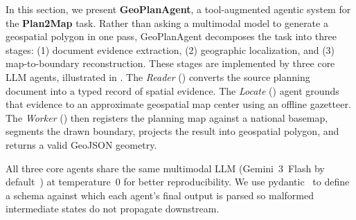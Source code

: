 \documentclass[11pt]{article}
\begin{document}
In this section, we present \textbf{GeoPlanAgent}, a tool-augmented agentic system for the \textbf{Plan2Map} task. Rather than asking a multimodal model to generate a geospatial polygon in one pass, GeoPlanAgent decomposes the task into three stages: (1) document evidence extraction, (2) geographic localization, and (3) map-to-boundary reconstruction. These stages are implemented by three core LLM agents, illustrated in . The \emph{Reader} () converts the source planning document into a typed record of spatial evidence. The \emph{Locate} () agent grounds that evidence to an approximate geospatial map center using an offline gazetteer. The \emph{Worker} () then registers the planning map against a national basemap, segments the drawn boundary, projects the result into geospatial polygon, and returns a valid GeoJSON geometry.




All three core agents share the same multimodal LLM (Gemini~3~Flash by default~\cite{google2025geminiflash3}) at temperature~0 for better reproducibility. We use pydantic~\cite{Colvin_Pydantic_Validation_2026} to define a schema against which each agent's final output is parsed so malformed intermediate states do not propagate downstream.
\end{document}
